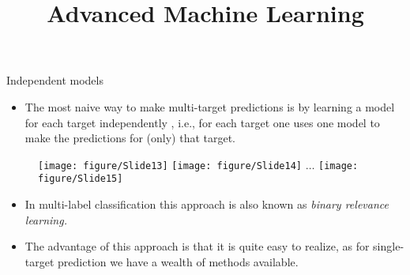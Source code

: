 \documentclass[11pt,compress,t,notes=noshow, xcolor=table]{beamer}
\title{Advanced Machine Learning}
\date{}
\begin{document}



\sloppy


\begin{frame}{Independent models}
%	
	\begin{itemize}
		\item 	The most naive way to make multi-target predictions is by learning a model for each target independently , i.e., for each target one uses one model to make the predictions for (only) that target.
%	
	\end{itemize}

	\begin{figure}
		\centering
		\texttt{[image: figure/Slide13]}
		\texttt{[image: figure/Slide14]} 
%		
		$\ldots$
%		
		\texttt{[image: figure/Slide15]}
	\end{figure}
%	
%
	\begin{itemize}
%		
		\item In multi-label classification this approach is also known as \emph{binary relevance learning.}
		\item The advantage of this approach is that it is quite easy to realize, as for single-target prediction we have a wealth of methods available.
	\end{itemize}

\end{frame}
\end{document}

